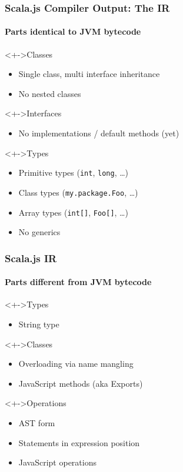 \documentclass{beamer}
\begin{document}
\begin{frame}
  \frametitle{Scala.js Compiler Output: The IR}
  \framesubtitle{Parts identical to JVM bytecode}

  \begin{block}<+->{Classes}
    \begin{itemize}
    \item Single class, multi interface inheritance
    \item No nested classes
    \end{itemize}
  \end{block}

  \begin{block}<+->{Interfaces}
    \begin{itemize}
    \item No implementations / default methods (yet)
    \end{itemize}
  \end{block}

  \begin{block}<+->{Types}
    \begin{itemize}
    \item Primitive types (\texttt{int}, \texttt{long}, \ldots)
    \item Class types (\texttt{my.package.Foo}, \ldots)
    \item Array types (\texttt{int[]}, \texttt{Foo[]}, \ldots)
    \item No generics
    \end{itemize}
  \end{block}
\end{frame}

\begin{frame}
  \frametitle{Scala.js IR}
  \framesubtitle{Parts different from JVM bytecode}

  \begin{block}<+->{Types}
    \begin{itemize}
    \item String type
    \end{itemize}
  \end{block}

  \begin{block}<+->{Classes}
    \begin{itemize}
    \item Overloading via name mangling
    \item JavaScript methods (aka Exports)
    \end{itemize}
  \end{block}

  \begin{block}<+->{Operations}
    \begin{itemize}
    \item<-4> AST form
    \item<-4> Statements in expression position
    \item<-5> JavaScript operations
    \end{itemize}
  \end{block}
\end{frame}
\end{document}
